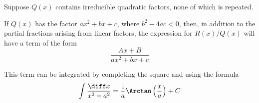 \begin{frame}
Suppose $Q(x)$ contains irreducible quadratic factors, none of which is repeated.

If $Q(x)$ has the factor $ax^2 + bx + c$, where $b^2-4ac < 0$, then, in addition to the partial fractions arising from linear factors, the expression for $R(x)/Q(x)$ will have a term of the form
\[
\frac{Ax+B}{ax^2+bx+c}
\]

This term can be integrated by completing the square and using the formula
\[
\int \frac{\diff x}{x^2+a^2} = \frac{1}{a} \Arctan \left( \frac{x}{a}\right) + C
\]
\end{frame}
